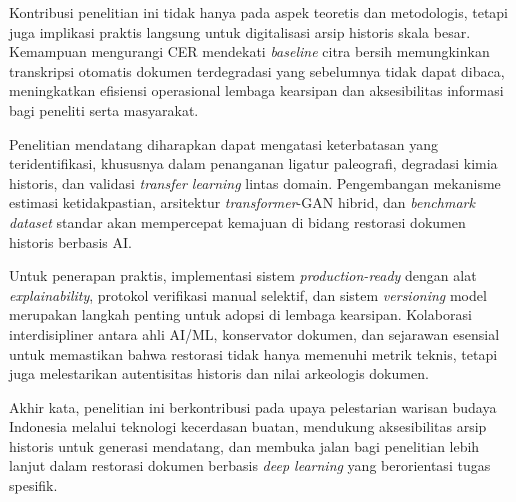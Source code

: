 \documentclass[12pt,a4paper]{article}
\begin{document}
Kontribusi penelitian ini tidak hanya pada aspek teoretis dan metodologis, tetapi juga implikasi praktis langsung untuk digitalisasi arsip historis skala besar. Kemampuan mengurangi CER mendekati \textit{baseline} citra bersih memungkinkan transkripsi otomatis dokumen terdegradasi yang sebelumnya tidak dapat dibaca, meningkatkan efisiensi operasional lembaga kearsipan dan aksesibilitas informasi bagi peneliti serta masyarakat.

\vspace{0.8em}

Penelitian mendatang diharapkan dapat mengatasi keterbatasan yang teridentifikasi, khususnya dalam penanganan ligatur paleografi, degradasi kimia historis, dan validasi \textit{transfer learning} lintas domain. Pengembangan mekanisme estimasi ketidakpastian, arsitektur \textit{transformer}-GAN hibrid, dan \textit{benchmark dataset} standar akan mempercepat kemajuan di bidang restorasi dokumen historis berbasis AI.

\vspace{0.8em}

Untuk penerapan praktis, implementasi sistem \textit{production-ready} dengan alat \textit{explainability}, protokol verifikasi manual selektif, dan sistem \textit{versioning} model merupakan langkah penting untuk adopsi di lembaga kearsipan. Kolaborasi interdisipliner antara ahli AI/ML, konservator dokumen, dan sejarawan esensial untuk memastikan bahwa restorasi tidak hanya memenuhi metrik teknis, tetapi juga melestarikan autentisitas historis dan nilai arkeologis dokumen.

\vspace{0.8em}

Akhir kata, penelitian ini berkontribusi pada upaya pelestarian warisan budaya Indonesia melalui teknologi kecerdasan buatan, mendukung aksesibilitas arsip historis untuk generasi mendatang, dan membuka jalan bagi penelitian lebih lanjut dalam restorasi dokumen berbasis \textit{deep learning} yang berorientasi tugas spesifik.
\end{document}
